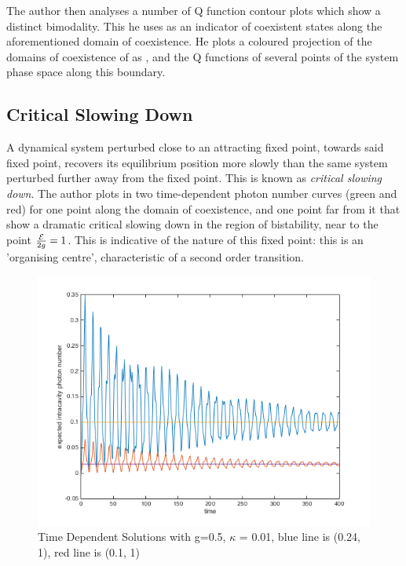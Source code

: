 The author then analyses a number of Q function contour plots which show a distinct bimodality. This he uses as an indicator of coexistent states along the aforementioned domain of coexistence. He plots a coloured projection of the domains of coexistence of \autocite[Figure 1 right hand side]{Carmichael2015} as \autocite[Figure 2]{Carmichael2015}, and the Q functions of several points of the system phase space along this boundary.

\subsection{Critical Slowing Down}

A dynamical system perturbed close to an attracting fixed point, towards said fixed point, recovers its equilibrium position more slowly than the same system perturbed further away from the fixed point. This is known as \emph{critical slowing down}\autocite[40, 56]{Strogatz1994}. The author plots in \autocite[Figure 3]{Carmichael2015} two time-dependent photon number curves (green and red) for one point along the domain of coexistence, and one point far from it that show a dramatic critical slowing down in the region of bistability, near to the point $\frac{\mathcal{E}}{2g} = 1$. This is indicative of the nature of this fixed point: this is an 'organising centre', characteristic of a second order transition.

\begin{figure}[h]
	\centering
	\includegraphics[width=1\textwidth]{Images/CriticalSlowing.png}
	\caption{Time Dependent Solutions with g=0.5, $\kappa$ = 0.01, blue line is (0.24, 1), red line is (0.1, 1)}
	\label{fig:CriticalSlowing}
\end{figure}

